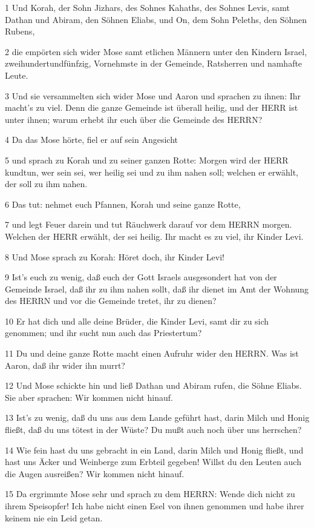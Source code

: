 \par 1 Und Korah, der Sohn Jizhars, des Sohnes Kahaths, des Sohnes Levis, samt Dathan und Abiram, den Söhnen Eliabs, und On, dem Sohn Peleths, den Söhnen Rubens,
\par 2 die empörten sich wider Mose samt etlichen Männern unter den Kindern Israel, zweihundertundfünfzig, Vornehmste in der Gemeinde, Ratsherren und namhafte Leute.
\par 3 Und sie versammelten sich wider Mose und Aaron und sprachen zu ihnen: Ihr macht's zu viel. Denn die ganze Gemeinde ist überall heilig, und der HERR ist unter ihnen; warum erhebt ihr euch über die Gemeinde des HERRN?
\par 4 Da das Mose hörte, fiel er auf sein Angesicht
\par 5 und sprach zu Korah und zu seiner ganzen Rotte: Morgen wird der HERR kundtun, wer sein sei, wer heilig sei und zu ihm nahen soll; welchen er erwählt, der soll zu ihm nahen.
\par 6 Das tut: nehmet euch Pfannen, Korah und seine ganze Rotte,
\par 7 und legt Feuer darein und tut Räuchwerk darauf vor dem HERRN morgen. Welchen der HERR erwählt, der sei heilig. Ihr macht es zu viel, ihr Kinder Levi.
\par 8 Und Mose sprach zu Korah: Höret doch, ihr Kinder Levi!
\par 9 Ist's euch zu wenig, daß euch der Gott Israels ausgesondert hat von der Gemeinde Israel, daß ihr zu ihm nahen sollt, daß ihr dienet im Amt der Wohnung des HERRN und vor die Gemeinde tretet, ihr zu dienen?
\par 10 Er hat dich und alle deine Brüder, die Kinder Levi, samt dir zu sich genommen; und ihr sucht nun auch das Priestertum?
\par 11 Du und deine ganze Rotte macht einen Aufruhr wider den HERRN. Was ist Aaron, daß ihr wider ihn murrt?
\par 12 Und Mose schickte hin und ließ Dathan und Abiram rufen, die Söhne Eliabs. Sie aber sprachen: Wir kommen nicht hinauf.
\par 13 Ist's zu wenig, daß du uns aus dem Lande geführt hast, darin Milch und Honig fließt, daß du uns tötest in der Wüste? Du mußt auch noch über uns herrschen?
\par 14 Wie fein hast du uns gebracht in ein Land, darin Milch und Honig fließt, und hast uns Äcker und Weinberge zum Erbteil gegeben! Willst du den Leuten auch die Augen ausreißen? Wir kommen nicht hinauf.
\par 15 Da ergrimmte Mose sehr und sprach zu dem HERRN: Wende dich nicht zu ihrem Speisopfer! Ich habe nicht einen Esel von ihnen genommen und habe ihrer keinem nie ein Leid getan.

